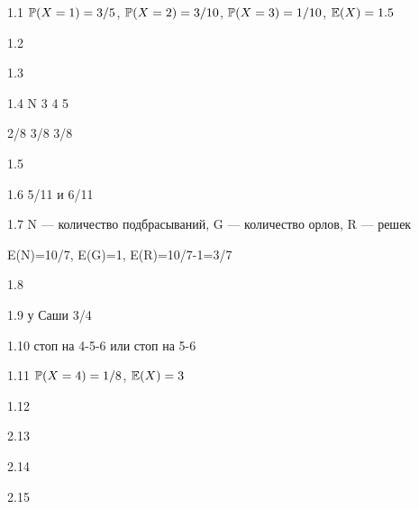 \protect \hypertarget {soln:1.1}{}
\begin{solution}{{1.1}}
  $\P(X=1)=3/5$, $\P(X=2)=3/10$, $\P(X=3)=1/10$, $\E(X)=1.5$
\end{solution}
\protect \hypertarget {soln:1.2}{}
\begin{solution}{{1.2}}
\end{solution}
\protect \hypertarget {soln:1.3}{}
\begin{solution}{{1.3}}
\end{solution}
\protect \hypertarget {soln:1.4}{}
\begin{solution}{{1.4}}
   N 3 4 5

  2/8 3/8 3/8
\end{solution}
\protect \hypertarget {soln:1.5}{}
\begin{solution}{{1.5}}
\end{solution}
\protect \hypertarget {soln:1.6}{}
\begin{solution}{{1.6}}
  5/11 и 6/11
\end{solution}
\protect \hypertarget {soln:1.7}{}
\begin{solution}{{1.7}}
  N — количество подбрасываний, G — количество орлов, R — решек

  E(N)=10/7, E(G)=1, E(R)=10/7-1=3/7
\end{solution}
\protect \hypertarget {soln:1.8}{}
\begin{solution}{{1.8}}
\end{solution}
\protect \hypertarget {soln:1.9}{}
\begin{solution}{{1.9}}
  у Саши 3/4
\end{solution}
\protect \hypertarget {soln:1.10}{}
\begin{solution}{{1.10}}
  стоп на 4-5-6 или стоп на 5-6
\end{solution}
\protect \hypertarget {soln:1.11}{}
\begin{solution}{{1.11}}
  $\P(X=4)=1/8$, $\E(X)=3$
\end{solution}
\protect \hypertarget {soln:1.12}{}
\begin{solution}{{1.12}}
\end{solution}
\protect \hypertarget {soln:2.13}{}
\begin{solution}{{2.13}}
\end{solution}
\protect \hypertarget {soln:2.14}{}
\begin{solution}{{2.14}}
\end{solution}
\protect \hypertarget {soln:2.15}{}
\begin{solution}{{2.15}}
\end{solution}
